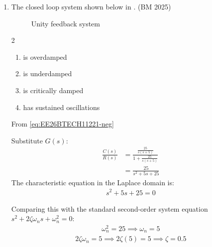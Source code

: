 \begin{enumerate}[label=\thesubsection.\arabic*, ref=\thesubsection.\theenumi]
\begin{multicols}{4}
\begin{enumerate}
\item $f(a) < f(b)$
\end{enumerate}
\end{multicols}
\solution
	From \eqref{eq:EE26BTECH11221-rolle},
\begin{align}
f(a) \ne f(b).
\end{align}
\item The closed loop system shown below
  in 
\underline{\hspace{1cm}}.
\hfill  (BM 2025)
	\begin{figure}[H]
  \centering
  \resizebox{0.75\columnwidth}{!}{%
	  
  }
  \caption{Unity feedback system}
  \label{fig:EE26BTECH11221-unity-feedback-second}
\end{figure}
%
\begin{multicols}{2}
\begin{enumerate}
\setlength{\itemsep}{0pt}
\item is overdamped
\item is underdamped
\item is critically damped
\item has sustained oscillations
\end{enumerate}
\end{multicols}
\solution
From \eqref{eq:EE26BTECH11221-neg}

Substitute $G(s)$:
\begin{align}
\frac{C(s)}{R(s)} &= \frac{\frac{25}{s(s+5)}}{1 + \frac{25}{s(s+5)}} \\
&= \frac{25}{s^2 + 5s + 25}
\end{align}
\iffalse
The characteristic equation in the Laplace domain is:
\begin{align}
s^2 + 5s + 25 = 0
\end{align}

Comparing this with the standard second-order system equation $s^2 + 2\zeta\omega_n s + \omega_n^2 = 0$:
\begin{align}
\omega_n^2 = 25 \implies \omega_n = 5
\end{align}
\begin{align}
2\zeta\omega_n = 5 \implies 2\zeta(5)= 5 \implies \zeta = 0.5
\end{align}


\end{enumerate}

